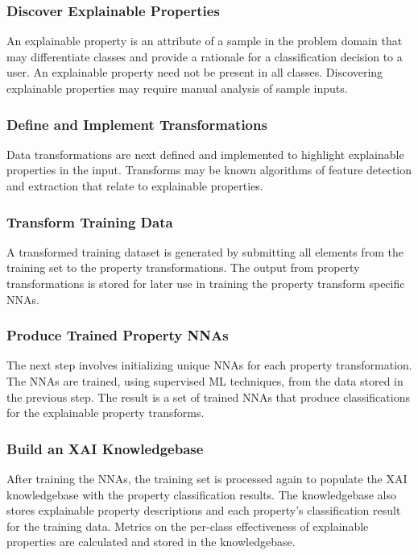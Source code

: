 \documentclass[conference]{IEEEtran}
\begin{document}
\subsubsection{Discover Explainable Properties}
An explainable property is an attribute of a sample in the problem domain that
may differentiate classes and provide a rationale for a classification decision
to a user.   An explainable property need not be present in all classes.
Discovering explainable properties may require manual analysis of sample inputs.

\subsubsection{Define and Implement Transformations}
Data transformations are next defined and implemented to highlight explainable
properties in the input.  Transforms may be known algorithms of feature
detection and extraction that relate to explainable properties.

\subsubsection{Transform Training Data} 
A transformed training dataset is generated by submitting all elements from the
training set to the property transformations.  The output from property
transformations is stored for later use in training the property transform
specific NNAs. 

\subsubsection{Produce Trained Property NNAs}
The next step involves initializing unique NNAs for each property
transformation.  The NNAs are trained, using supervised ML techniques, from the
data stored in the previous step.  The result is a set of trained NNAs that
produce classifications for the explainable property transforms.

\subsubsection{Build an XAI Knowledgebase}
After training the NNAs, the training set is processed again to populate the XAI
knowledgebase with the property classification results.  The knowledgebase also
stores explainable property descriptions and each property's classification
result for the training data.  Metrics on the per-class effectiveness of
explainable properties are calculated and stored in the knowledgebase.
\end{document}

